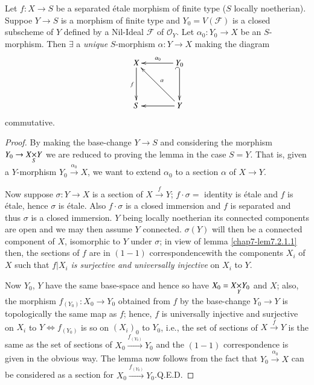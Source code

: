 \begin{sublemma}\label{chap7-lem7.2.1.2}
Let $f:X\to S$ be a separated \'etale morphism of finite type ($S$
locally noetherian). Suppoe $Y\to S$ is a morphism of finite type and
$Y_{0}=V(\mathscr{F})$ is a closed subscheme of $Y$ defined by a
Nil-Ideal $\mathscr{F}$ of $\mathscr{O}_{Y}$. Let $\alpha_{0}:Y_{0}\to
X$ be an $S$-morphism. Then $\exists$ a {\em unique} $S$-morphism
$\alpha:Y\to X$ making the diagram
\[
\xymatrix@=1.3cm{
X\ar[d]_{f} & Y_{0}\ar[l]_{\alpha_{0}}\ar@{_{(}->}[d]\\
S & Y\ar[l]\ar[ul]_{\alpha}
}
\]
commutative.
\end{sublemma}

\begin{proof}
By making the base-change $Y\to S$ and considering the morphism
$Y_{0}\to \fprod{X}{Y}{S}$ we are reduced to proving the lemma in the
case $S=Y$. That is, given a $Y$-morphism
$Y_{0}\xrightarrow{\alpha_{0}}X$, we want to extend $\alpha_{0}$ to a
section $\alpha$ of $X\to Y$.

Now suppose $\sigma:Y\to X$ is a section of $X\xrightarrow{f}Y$;
$f\cdot \sigma=$ identity is \'etale and $f$ is \'etale, hence
$\sigma$ is \'etale. Also $f\cdot \sigma$ is a closed immersion and
$f$ is separated and thus $\sigma$ is a closed immersion. $Y$ being
locally noetherian its connected components are open and we may then
assume $Y$ connected. $\sigma(Y)$ will then be a connected component
of $X$, isomorphic to $Y$ under $\sigma$; in view of lemma
\ref{chap7-lem7.2.1.1} then, the sections of $f$ are in $(1-1)$
correspondence\pageoriginale with the components $X_{i}$ of $X$ such
that $f|X_{i}$ {\em is surjective and universally injective} on
$X_{i}$ to $Y$.

Now $Y_{0}$, $Y$ have the same base-space and hence so have
$X_{0}=\fprod{X}{Y_{0}}{Y}$ and $X$; also, the morphism
$f_{(Y_{0})}:X_{0}\to Y_{0}$ obtained from $f$ by the base-change
$Y_{0}\to Y$ is topologically the same map as $f$; hence, $f$ is
universally injective and surjective on $X_{i}$ to $Y\Leftrightarrow
f_{(Y_{0})}$ is so on $(X_{i})_{0}$ to $Y_{0}$, i.e., the set of
sections of $X\xrightarrow{f}Y$ is the same as the set of sections of
$X_{0}\xrightarrow{f_{(Y_{0})}}Y_{0}$ and the $(1-1)$ correspondence
is given in the obvious way. The lemma now follows from the fact that
$Y_{0}\xrightarrow{\alpha_{0}}X$ can be considered as a section for
$X_{0}\xrightarrow{f_{(Y_{0})}}Y_{0}$.\hfill Q.E.D.
\end{proof}

